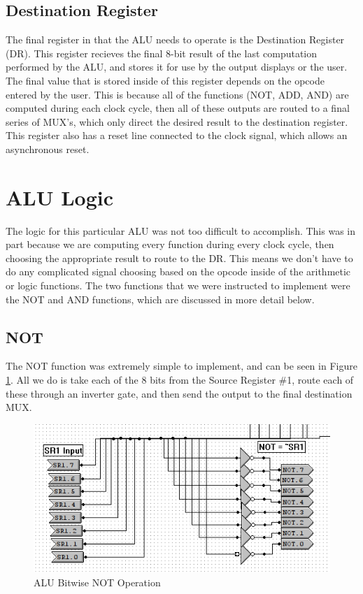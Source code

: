 \documentclass[a4paper,11pt]{article}
\begin{document}
\subsection{Destination Register}

The final register in that the ALU needs to operate is the Destination Register (DR). This register recieves the final 8-bit result of the last computation performed by the ALU, and stores it for use by the output displays or the user. The final value that is stored inside of this register depends on the opcode entered by the user. This is because all of the functions (NOT, ADD, AND) are computed during each clock cycle, then all of these outputs are routed to a final series of MUX's, which only direct the desired result to the destination register. This register also has a reset line connected to the clock signal, which allows an asynchronous reset.

\section{ALU Logic}
The logic for this particular ALU was not too difficult to accomplish. This was in part because we are computing every function during every clock cycle, then choosing the appropriate result to route to the DR. This means we don't have to do any complicated signal choosing based on the opcode inside of the arithmetic or logic functions. The two functions that we were instructed to implement were the NOT and AND functions, which are discussed in more detail below.

\subsection{NOT}
The NOT function was extremely simple to implement, and can be seen in Figure \ref{fig:notfunction}. All we do is take each of the 8 bits from the Source Register \#1, route each of these through an inverter gate, and then send the output to the final destination MUX. 

  \begin{figure}
       \includegraphics[width=4.7in]{pictures/notfunction}
     \caption{ALU Bitwise NOT Operation}
     \label{fig:notfunction}
  \end{figure} 
\end{document}

